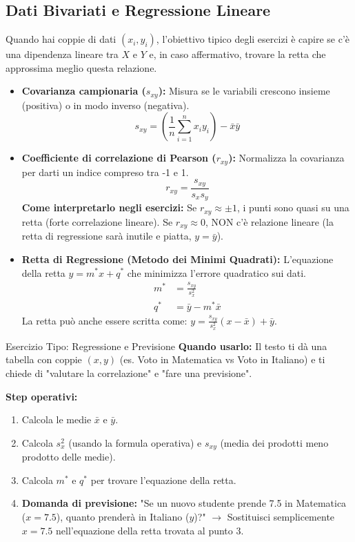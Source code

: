\documentclass[12pt]{extarticle} %
\begin{document}
\subsection{Dati Bivariati e Regressione Lineare}
Quando hai coppie di dati $(x_i, y_i)$, l'obiettivo tipico degli esercizi è capire se c'è una dipendenza lineare tra $X$ e $Y$ e, in caso affermativo, trovare la retta che approssima meglio questa relazione.

\begin{itemize}
    \item \textbf{Covarianza campionaria ($s_{xy}$):} Misura se le variabili crescono insieme (positiva) o in modo inverso (negativa).
    $$ s_{xy} = \left( \frac{1}{n} \sum_{i=1}^{n} x_i y_i \right) - \bar{x}\bar{y} $$
    
    \item \textbf{Coefficiente di correlazione di Pearson ($r_{xy}$):} Normalizza la covarianza per darti un indice compreso tra -1 e 1.
    $$ r_{xy} = \frac{s_{xy}}{s_x s_y} $$
    {\footnotesize\textbf{Come interpretarlo negli esercizi:} Se $r_{xy} \approx \pm 1$, i punti sono quasi su una retta (forte correlazione lineare). Se $r_{xy} \approx 0$, NON c'è relazione lineare (la retta di regressione sarà inutile e piatta, $y = \bar{y}$).}
    
    \item \textbf{Retta di Regressione (Metodo dei Minimi Quadrati):} L'equazione della retta $y = m^*x + q^*$ che minimizza l'errore quadratico sui dati.
    \begin{align*}
        m^* &= \frac{s_{xy}}{s_x^2} \\
        q^* &= \bar{y} - m^*\bar{x}
    \end{align*}
    La retta può anche essere scritta come: $y = \frac{s_{xy}}{s_x^2}(x - \bar{x}) + \bar{y}$.
\end{itemize}

\begin{eserciziobox}{Esercizio Tipo: Regressione e Previsione}
\textbf{Quando usarlo:} Il testo ti dà una tabella con coppie $(x,y)$ (es. Voto in Matematica vs Voto in Italiano) e ti chiede di "valutare la correlazione" e "fare una previsione".

\textbf{Step operativi:}
\begin{enumerate}
    \item Calcola le medie $\bar{x}$ e $\bar{y}$.
    \item Calcola $s_x^2$ (usando la formula operativa) e $s_{xy}$ (media dei prodotti meno prodotto delle medie).
    \item Calcola $m^*$ e $q^*$ per trovare l'equazione della retta.
    \item \textbf{Domanda di previsione:} "Se un nuovo studente prende 7.5 in Matematica ($x=7.5$), quanto prenderà in Italiano ($y$)?" $\to$ Sostituisci semplicemente $x=7.5$ nell'equazione della retta trovata al punto 3.
\end{enumerate}
\end{eserciziobox}
\end{document}
